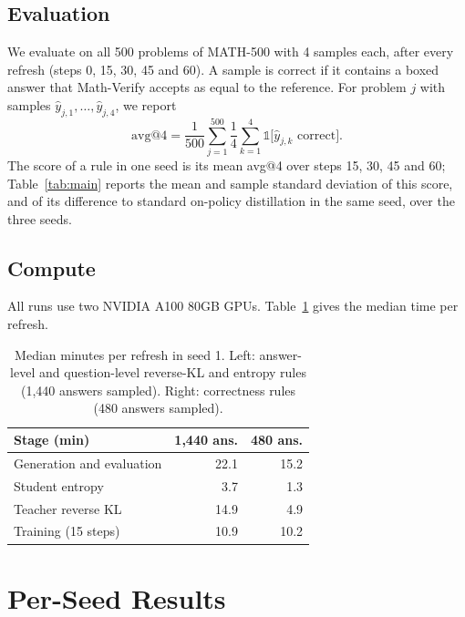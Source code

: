 \documentclass[11pt]{article}
\begin{document}
\subsection{Evaluation}
We evaluate on all 500 problems of MATH-500 with 4 samples each, after every refresh (steps 0, 15, 30, 45 and 60).
A sample is correct if it contains a boxed answer that Math-Verify accepts as equal to the reference.
For problem $j$ with samples $\hat{y}_{j,1},\dots,\hat{y}_{j,4}$, we report
\begin{equation}
\text{avg@4} = \frac{1}{500} \sum_{j=1}^{500} \frac{1}{4} \sum_{k=1}^{4} \mathbb{1}\big[\hat{y}_{j,k} \text{ correct}\big].
\end{equation}
The score of a rule in one seed is its mean avg@4 over steps 15, 30, 45 and 60; Table~\ref{tab:main} reports the mean and sample standard deviation of this score, and of its difference to standard on-policy distillation in the same seed, over the three seeds.

\subsection{Compute}
All runs use two NVIDIA A100 80GB GPUs.
Table~\ref{tab:cost} gives the median time per refresh.

\begin{table}[H]
\centering
\small
\begin{tabular}{@{}lrr@{}}
\toprule
\textbf{Stage (min)} & \textbf{1,440 ans.} & \textbf{480 ans.} \\
\midrule
Generation and evaluation & 22.1 & 15.2 \\
Student entropy & 3.7 & 1.3 \\
Teacher reverse KL & 14.9 & 4.9 \\
Training (15 steps) & 10.9 & 10.2 \\
\bottomrule
\end{tabular}
\caption{Median minutes per refresh in seed 1. Left: answer-level and question-level reverse-KL and entropy rules (1,440 answers sampled). Right: correctness rules (480 answers sampled).}
\label{tab:cost}
\end{table}

\section{Per-Seed Results}
\label{app:seeds}
\end{document}
